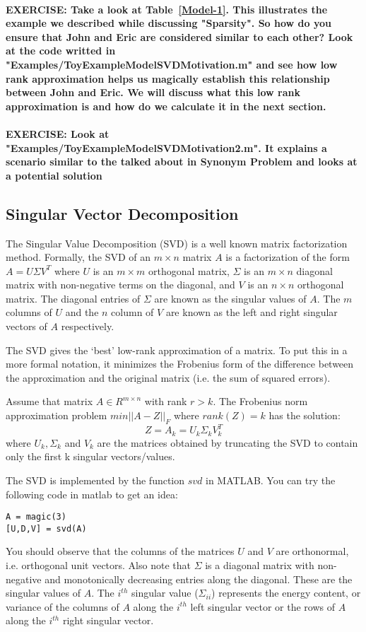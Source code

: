\\
\textbf{EXERCISE: Take a look at Table~\ref{Model-1}. This illustrates the example we described while discussing "Sparsity". So how do you ensure that John and Eric are considered similar to each other? Look at the code writted in "Examples/ToyExampleModelSVDMotivation.m" and see how low rank approximation helps us magically establish this relationship between John and Eric. We will discuss what this low rank approximation is and how do we calculate it in the next section. }
\\
\\
\textbf{EXERCISE: Look at "Examples/ToyExampleModelSVDMotivation2.m". It explains a scenario similar to the talked about in Synonym Problem and looks at a potential solution }
  \subsection{Singular Vector Decomposition}

The Singular Value Decomposition (SVD) is a well known matrix factorization method. Formally, the SVD of an $m \times n$ matrix $A$ is a factorization of the form $A = U \Sigma V^{T}$ where $U$ is an $m \times m$ orthogonal matrix, $\Sigma$ is an $m \times n$ diagonal matrix with non-negative terms on the diagonal, and $V$ is an $n \times n$ orthogonal matrix. The diagonal entries of $\Sigma$ are known as the singular values of $A$. The $m$ columns of $U$ and the $n$ column of $V$ are known as the left and right singular vectors of $A$ respectively. 

The SVD gives the `best' low-rank approximation of a matrix. To put this in a more formal notation, it minimizes the Frobenius form of the difference between the approximation and the original matrix (i.e. the sum of squared errors).

Assume that matrix $A \in R^{m \times n}$ with rank $r > k$. The Frobenius norm approximation problem $min || A - Z ||_{F}$ where $rank(Z) = k$ has the solution:
\[Z = A_{k} = U_{k} \Sigma_{k} V_{k}^{T}\]
where $U_{k}, \Sigma_{k}$ and $V_{k}$ are the matrices obtained by truncating the SVD to contain only the first k singular vectors/values.

The SVD is implemented by the function $svd$ in MATLAB. You can try the following code in matlab to get an idea:
\begin{verbatim}
A = magic(3)
[U,D,V] = svd(A)
\end{verbatim}

You should observe that the columns of the matrices $U$ and $V$ are orthonormal, i.e. orthogonal unit vectors. Also note that $\Sigma$ is a diagonal matrix with non-negative and monotonically decreasing entries along the diagonal. These are the singular values of $A$. The $i^{th}$ singular value ($\Sigma_{ii}$) represents the energy content, or variance of the columns of $A$ along the $i^{th}$ left singular vector or the rows of $A$ along the $i^{th}$ right singular vector.

